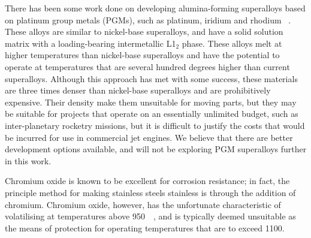 There has been some work done on developing alumina-forming superalloys based on platinum group metals (PGMs), such as platinum, iridium and rhodium ~\cite{wenderoth05, mitarai98, mitarai97}. These alloys are similar to nickel-base superalloys, and have a solid solution matrix with a loading-bearing intermetallic L1$_2$ phase. These alloys melt at higher temperatures than nickel-base superalloys and have the potential to operate at temperatures that are several hundred degrees higher than current superalloys. Although this approach has met with some success, these materials are three times denser than nickel-base superalloys and are prohibitively expensive.  Their density make them unsuitable for moving parts, but they may be suitable for projects that operate on an essentially unlimited budget, such as inter-planetary rocketry missions, but it is difficult to justify the costs that would be incurred for use in commercial jet engines.  We believe that there are better development options available, and will not be exploring PGM superalloys further in this work. 

Chromium oxide is known to be excellent for corrosion resistance; in fact, the principle method for making stainless steels stainless is through the addition of chromium.  Chromium oxide, however, has the unfortunate characteristic of volatilising at temperatures above 950\celsius\ ~\cite{perez02}, and is typically deemed unsuitable as the means of protection for operating temperatures that are to exceed 1100\celsius.

